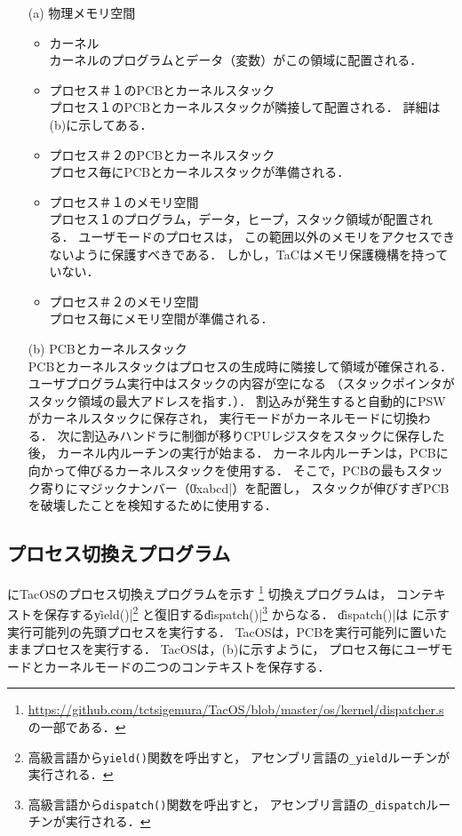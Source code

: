 \begin{enumerate}
\item[(a)] 物理メモリ空間

\begin{itemize}
\item カーネル \\
カーネルのプログラムとデータ（変数）がこの領域に配置される．

\item プロセス＃１のPCBとカーネルスタック \\
プロセス１のPCBとカーネルスタックが隣接して配置される．
詳細は(b)に示してある．

\item プロセス＃２のPCBとカーネルスタック \\
プロセス毎にPCBとカーネルスタックが準備される．

\item プロセス＃１のメモリ空間 \\
プロセス１のプログラム，データ，ヒープ，スタック領域が配置される．
ユーザモードのプロセスは，
この範囲以外のメモリをアクセスできないように保護すべきである．
しかし，TaCはメモリ保護機構を持っていない．

\item プロセス＃２のメモリ空間 \\
プロセス毎にメモリ空間が準備される．
\end{itemize}

\item[(b)] PCBとカーネルスタック \\
PCBとカーネルスタックはプロセスの生成時に隣接して領域が確保される．
ユーザプログラム実行中はスタックの内容が空になる
（スタックポインタがスタック領域の最大アドレスを指す．）．
割込みが発生すると自動的にPSWがカーネルスタックに保存され，
実行モードがカーネルモードに切換わる．
次に割込みハンドラに制御が移りCPUレジスタをスタックに保存した後，
カーネル内ルーチンの実行が始まる．
カーネル内ルーチンは，PCBに向かって伸びるカーネルスタックを使用する．
そこで，PCBの最もスタック寄りにマジックナンバー（\|0xabcd|）を配置し，
スタックが伸びすぎPCBを破壊したことを検知するために使用する．
\end{enumerate}

\subsection{プロセス切換えプログラム}
にTacOSのプロセス切換えプログラムを示す
\footnote{%
\url{https://github.com/tctsigemura/TacOS/blob/master/os/kernel/dispatcher.s}
の一部である．}
切換えプログラムは，
コンテキストを保存する\|yield()|\footnote{
高級言語から{\tt yield()}関数を呼出すと，
アセンブリ言語の{\tt \_yield}ルーチンが実行される．}
と復旧する\|dispatch()|\footnote{
高級言語から{\tt dispatch()}関数を呼出すと，
アセンブリ言語の{\tt \_dispatch}ルーチンが実行される．}
からなる．
\|dispatch()|は
に示す実行可能列の先頭プロセスを実行する．
TacOSは，PCBを実行可能列に置いたままプロセスを実行する．
TacOSは，(b)に示すように，
プロセス毎にユーザモードとカーネルモードの二つのコンテキストを保存する．

